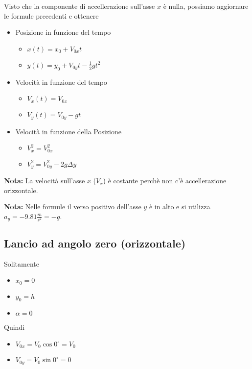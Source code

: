 \documentclass[../main.tex]{subfiles}
\begin{document}
\pagebreak
Visto che la componente di accellerazione sull'asse $x$ è nulla, possiamo aggiornare le formule precedenti e ottenere
\begin{itemize}
    \item Posizione in funzione del tempo
    \begin{itemize}
        \item $x(t) = x_0 + V_{0x}t$
        \item $y(t) = y_0 + V_{0y}t - \frac{1}{2}gt^2$
    \end{itemize}
    \item Velocità in funzione del tempo
    \begin{itemize}
        \item $V_x(t) = V_{0x}$
        \item $V_y(t) = V_{0y} - gt$
    \end{itemize}
    \item Velocità in funzione della Posizione
    \begin{itemize}
        \item $V_x^2 = V_{0x}^2$
        \item $V_y^2 = V_{0y}^2 - 2g\Delta y$
    \end{itemize}
\end{itemize}
\textbf{Nota:} La velocità sull'asse $x$ ($V_x$) è costante perchè non c'è accellerazione orizzontale.

\textbf{Nota:} Nelle formule il verso positivo dell'asse $y$ è in alto e si utilizza $a_y = -9.81\frac{m}{s^2} = -g$.

\vspace{1cm}
\subsection{Lancio ad angolo zero (orizzontale)}
Solitamente
\begin{itemize}
    \item $x_0 = 0$
    \item $y_0 = h$
    \item $\alpha = 0$
\end{itemize}

Quindi
\begin{itemize}
    \item $V_{0x} = V_0 \cos 0^\circ = V_0$
    \item $V_{0y} = V_0 \sin  0^\circ = 0$
\end{itemize}
\end{document}
